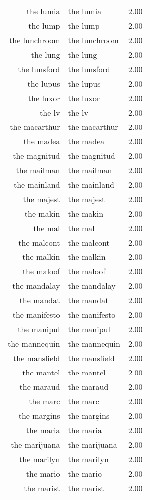 \begin{table}[ht]
\begin{tabular}{rlr}
  the lumia & the lumia & 2.00 \\ 
  the lump & the lump & 2.00 \\ 
  the lunchroom & the lunchroom & 2.00 \\ 
  the lung & the lung & 2.00 \\ 
  the lunsford & the lunsford & 2.00 \\ 
  the lupus & the lupus & 2.00 \\ 
  the luxor & the luxor & 2.00 \\ 
  the lv & the lv & 2.00 \\ 
  the macarthur & the macarthur & 2.00 \\ 
  the madea & the madea & 2.00 \\ 
  the magnitud & the magnitud & 2.00 \\ 
  the mailman & the mailman & 2.00 \\ 
  the mainland & the mainland & 2.00 \\ 
  the majest & the majest & 2.00 \\ 
  the makin & the makin & 2.00 \\ 
  the mal & the mal & 2.00 \\ 
  the malcont & the malcont & 2.00 \\ 
  the malkin & the malkin & 2.00 \\ 
  the maloof & the maloof & 2.00 \\ 
  the mandalay & the mandalay & 2.00 \\ 
  the mandat & the mandat & 2.00 \\ 
  the manifesto & the manifesto & 2.00 \\ 
  the manipul & the manipul & 2.00 \\ 
  the mannequin & the mannequin & 2.00 \\ 
  the mansfield & the mansfield & 2.00 \\ 
  the mantel & the mantel & 2.00 \\ 
  the maraud & the maraud & 2.00 \\ 
  the marc & the marc & 2.00 \\ 
  the margins & the margins & 2.00 \\ 
  the maria & the maria & 2.00 \\ 
  the marijuana & the marijuana & 2.00 \\ 
  the marilyn & the marilyn & 2.00 \\ 
  the mario & the mario & 2.00 \\ 
  the marist & the marist & 2.00 \\ 

\end{tabular}
\end{table}
